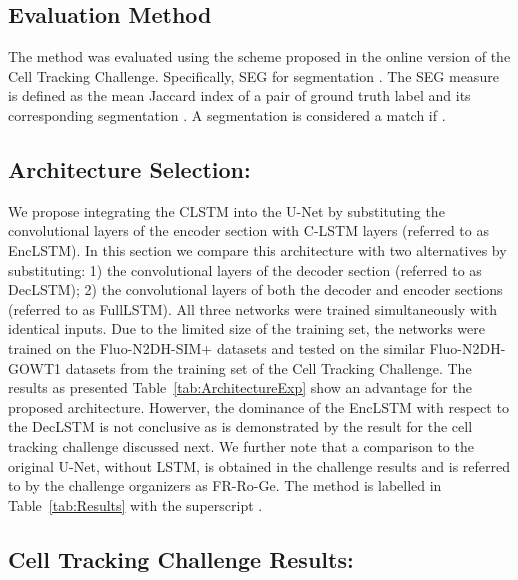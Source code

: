 \documentclass{article}
\begin{document}
\subsection{Evaluation Method}\label{subsec:Evaluation}
The method was evaluated using the scheme proposed
in the online version of the Cell Tracking Challenge. Specifically, SEG for segmentation \cite{Ulman17}. The SEG measure is defined as the mean Jaccard index
 of a pair of ground truth label  and its corresponding segmentation . A segmentation is considered a match if  . 



\subsection{Architecture Selection:}
 \label{ArchitectureSelection}
 We propose integrating the CLSTM into the U-Net by substituting the convolutional layers of the encoder section with C-LSTM layers (referred to as EncLSTM). 
In this section we compare this architecture with two alternatives by substituting: 1) the convolutional layers of the decoder section (referred to as DecLSTM); 2) the convolutional layers of both the decoder and encoder sections (referred to as FullLSTM). All three networks were trained simultaneously with identical inputs. Due to the limited size of the training set, the networks were trained on the Fluo-N2DH-SIM+ datasets and tested on the similar Fluo-N2DH-GOWT1 datasets from the training set of the Cell Tracking Challenge. The results as presented  Table~\ref{tab:ArchitectureExp} show an advantage for the proposed architecture. Howerver, the dominance of the EncLSTM with respect to the DecLSTM is not conclusive as is demonstrated by the result for the cell tracking challenge discussed next. We further note that a comparison to the original U-Net, without LSTM, is obtained in the challenge results and is referred to by the challenge organizers as FR-Ro-Ge. The method is labelled in Table~\ref{tab:Results} with the superscript .

\subsection{Cell Tracking Challenge Results:}
 \label{ChallengeExperiments}
 
\end{document}
